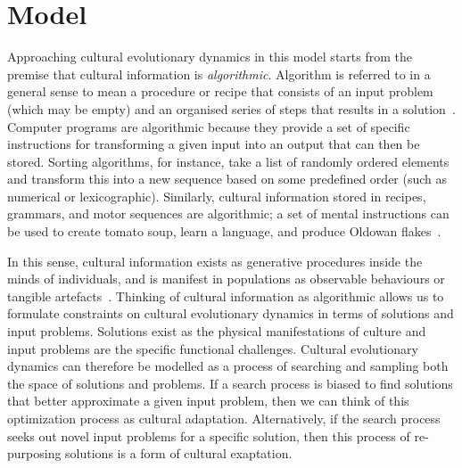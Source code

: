 \documentclass{article}
\begin{document}
\section{Model}
\sloppy
Approaching cultural evolutionary dynamics in this model starts from the premise that cultural information is {\em algorithmic}. Algorithm is referred to in a general sense to mean a procedure or recipe that consists of an input problem (which may be empty) and an organised series of steps that results in a solution~\cite{xxxx,mayfield2013engine}. Computer programs are algorithmic because they provide a set of specific instructions for transforming a given input into an output that can then be stored. Sorting algorithms, for instance, take a list of randomly ordered elements and transform this into a new sequence based on some predefined order (such as numerical or lexicographic). Similarly, cultural information stored in recipes, grammars, and motor sequences are algorithmic; a set of mental instructions can be used to create tomato soup, learn a language, and produce Oldowan flakes~\cite{arthur2009nature,charbonneau_all_2015,xxxx}.

In this sense, cultural information exists as generative procedures inside the minds of individuals, and is manifest in populations as observable behaviours or tangible artefacts~\cite{ferdinand2015inductive}. Thinking of cultural information as algorithmic allows us to formulate constraints on cultural evolutionary dynamics in terms of solutions and input problems. Solutions exist as the physical manifestations of culture and input problems are the specific functional challenges. Cultural evolutionary dynamics can therefore be modelled as a process of searching and sampling both the space of solutions and problems. If a search process is biased to find solutions that better approximate a given input problem, then we can think of this optimization process as cultural adaptation. Alternatively, if the search process seeks out novel input problems for a specific solution, then this process of re-purposing solutions is a form of cultural exaptation.
\end{document}
